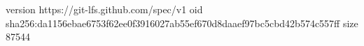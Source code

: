 version https://git-lfs.github.com/spec/v1
oid sha256:da1156ebae6753f62ee0f3916027ab55ef670d8daaef97bc5cbd42b574c557ff
size 87544
